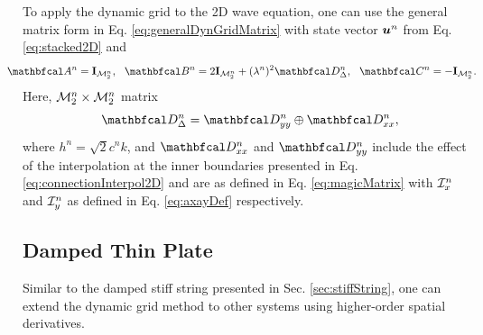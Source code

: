 \documentclass[fleqn]{jaes}
\begin{document}
To apply the dynamic grid to the 2D wave equation, one can use the general matrix form in Eq. \eqref{eq:generalDynGridMatrix} with state vector $\boldsymbol{u}^n$ from Eq. \eqref{eq:stacked2D} and
\begin{equation}\label{eq:2DwaveDynMatrix}
    \!\!\!\!\!\!\!\!\!\AA = \I_\MtwoD, \ \ \BB = 2\I_\MtwoD + (\lambda^n)^2\DDDelta,\ \ \CC = -\I_\MtwoD.
\end{equation}
Here,
${\mathcal{M}_2^n} \times {\mathcal{M}_2^n}$ matrix
\begin{equation}\label{eq:dynamicKronecker}
    \DDDelta = \DDyy \oplus \DDxx,
\end{equation}
where $h^n = \sqrt{2}c^n k$, and $\DDxx$ and $\DDyy$ include the effect of the interpolation at the inner boundaries presented in Eq. \eqref{eq:connectionInterpol2D} and are as defined in Eq. \eqref{eq:magicMatrix} with $\mathcal{I}^n_x$ and $\mathcal{I}^n_y$ as defined in Eq. \eqref{eq:axayDef} respectively.

\subsection{Damped Thin Plate}\label{sec:thinPlate}
Similar to the damped stiff string presented in Sec. \ref{sec:stiffString}, one can extend the dynamic grid method to other systems using higher-order spatial derivatives.
\end{document}
